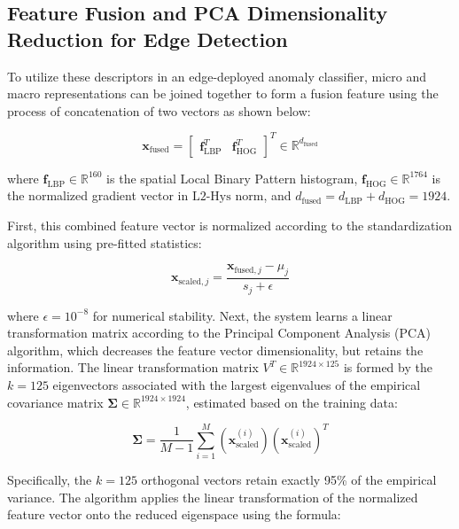 \subsection{Feature Fusion and PCA Dimensionality Reduction for Edge Detection}

To utilize these descriptors in an edge-deployed anomaly classifier, micro and macro representations can be joined together to form a fusion feature using the process of concatenation of two vectors \cite{liu2023tire} as shown below:

\begin{equation}
\mathbf{x}_{\text{fused}} = \begin{bmatrix} \mathbf{f}_{\text{LBP}}^T & \mathbf{f}_{\text{HOG}}^T \end{bmatrix}^T \in \mathbb{R}^{d_{\text{fused}}}
\end{equation}

where $\mathbf{f}_{\text{LBP}} \in \mathbb{R}^{160}$ is the spatial Local Binary Pattern histogram, $\mathbf{f}_{\text{HOG}} \in \mathbb{R}^{1764}$ is the normalized gradient vector in $\text{L2-Hys}$ norm, and $d_{\text{fused}} = d_{\text{LBP}} + d_{\text{HOG}} = 1924$.

First, this combined feature vector is normalized according to the standardization algorithm using pre-fitted statistics:

\begin{equation}
\mathbf{x}_{\text{scaled}, j} = \frac{\mathbf{x}_{\text{fused}, j} - \mu_j}{s_j + \epsilon}
\end{equation}

where $\epsilon = 10^{-8}$ for numerical stability. Next, the system learns a linear transformation matrix according to the Principal Component Analysis (PCA) algorithm, which decreases the feature vector dimensionality, but retains the information. The linear transformation matrix $V^T \in \mathbb{R}^{1924 \times 125}$ is formed by the $k = 125$ eigenvectors associated with the largest eigenvalues of the empirical covariance matrix $\mathbf{\Sigma} \in \mathbb{R}^{1924 \times 1924}$, estimated based on the training data:

\begin{equation}
\mathbf{\Sigma} = \frac{1}{M-1} \sum_{i=1}^{M} \left( \mathbf{x}_{\text{scaled}}^{(i)} \right) \left( \mathbf{x}_{\text{scaled}}^{(i)} \right)^T
\end{equation}

Specifically, the $k = 125$ orthogonal vectors retain exactly 95\% of the empirical variance. The algorithm applies the linear transformation of the normalized feature vector onto the reduced eigenspace using the formula:

